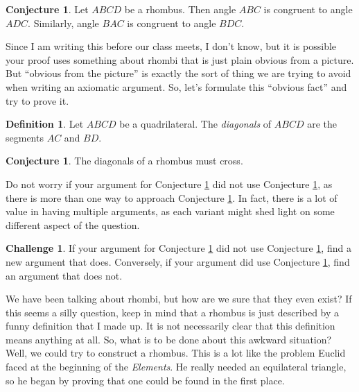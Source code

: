 \documentclass{tufte-handout}
\theoremstyle{definition}
\newtheorem{conjecture}[problem]{Conjecture}
\newtheorem*{definition}{Definition}
\newtheorem{challenge}[problem]{Challenge}
\begin{document}
\begin{conjecture}\label{conj:rhombus-angles}
Let $ABCD$ be a rhombus. Then angle $ABC$ is congruent to angle $ADC$. Similarly, angle $BAC$ is congruent to angle $BDC$.
\end{conjecture}



Since I am writing this before our class meets, I don't know, but it is possible your proof uses something about rhombi that is just plain obvious from a picture. 
But ``obvious from the picture'' is exactly the sort of thing we are trying to avoid when writing an axiomatic argument. 
So, let's formulate this ``obvious fact'' and try to prove it.


\begin{definition}\label{defn:diagonals}
Let $ABCD$ be a quadrilateral. The \emph{diagonals} of $ABCD$ are the segments $AC$ and $BD$.
\end{definition}

\begin{conjecture}\label{conj:rhombus-diagonals}
The diagonals of a rhombus must cross.
\end{conjecture}



Do not worry if your argument for Conjecture \ref{conj:rhombus-angles} did not use Conjecture \ref{conj:rhombus-diagonals}, as there is more than one way to approach Conjecture \ref{conj:rhombus-angles}. 
In fact, there is a lot of value in having multiple arguments, as each variant might shed light on some different aspect of the question. 

\begin{challenge}\label{conj:rhombus-angles-redo} 
If your argument for Conjecture \ref{conj:rhombus-angles} did not use Conjecture \ref{conj:rhombus-diagonals}, find a new argument that does. 
Conversely, if your argument did use Conjecture \ref{conj:rhombus-diagonals}, find an argument that does not.
\end{challenge}


We have been talking about rhombi, but how are we sure that they even exist? 
If this seems a silly question, keep in mind that a rhombus is just described by a funny definition that I made up.
It is not necessarily clear that this definition means anything at all.
So, what is to be done about this awkward situation? 
Well, we could try to construct a rhombus.
This is a lot like the problem Euclid faced at the beginning of the \emph{Elements}. 
He really needed an equilateral triangle, so he began by proving that one could be found in the first place.
\end{document}
